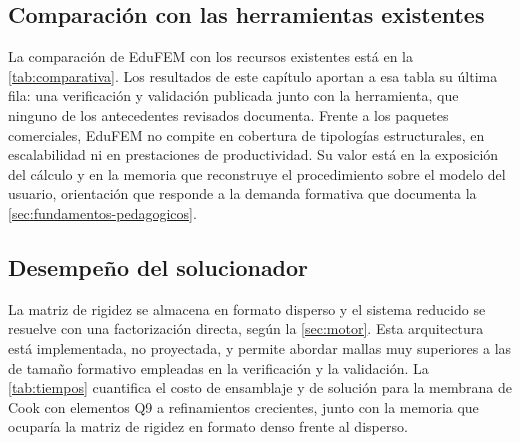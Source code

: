 \subsection{Comparación con las herramientas existentes}

La comparación de EduFEM con los recursos existentes está en la \autoref{tab:comparativa}. Los resultados de este capítulo aportan a esa tabla su última fila: una verificación y validación publicada junto con la herramienta, que ninguno de los antecedentes revisados documenta. Frente a los paquetes comerciales, EduFEM no compite en cobertura de tipologías estructurales, en escalabilidad ni en prestaciones de productividad. Su valor está en la exposición del cálculo y en la memoria que reconstruye el procedimiento sobre el modelo del usuario, orientación que responde a la demanda formativa que documenta la \autoref{sec:fundamentos-pedagogicos}.

\subsection{Desempeño del solucionador}

La matriz de rigidez se almacena en formato disperso y el sistema reducido se resuelve con una factorización directa, según la \autoref{sec:motor}. Esta arquitectura está implementada, no proyectada, y permite abordar mallas muy superiores a las de tamaño formativo empleadas en la verificación y la validación. La \autoref{tab:tiempos} cuantifica el costo de ensamblaje y de solución para la membrana de Cook con elementos Q9 a refinamientos crecientes, junto con la memoria que ocuparía la matriz de rigidez en formato denso frente al disperso.

